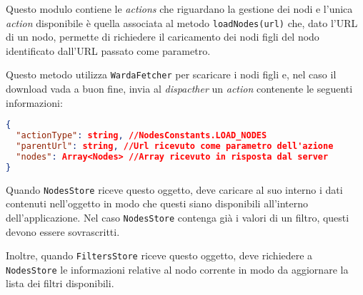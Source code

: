 Questo modulo contiene le \textit{actions} che riguardano la gestione dei nodi e l'unica \textit{action} disponibile è quella associata al metodo \texttt{loadNodes(url)} che, dato l'URL di un nodo, permette di richiedere il caricamento dei nodi figli del nodo identificato dall'URL passato come parametro.

Questo metodo utilizza \texttt{WardaFetcher} per scaricare i nodi figli e, nel caso il download vada a buon fine, invia al \textit{dispacther} un \textit{action} contenente le seguenti informazioni:
\begin{lstlisting}[language=JSON, caption=Action - load nodes]
{
  "actionType": string, //NodesConstants.LOAD_NODES
  "parentUrl": string, //Url ricevuto come parametro dell'azione
  "nodes": Array<Nodes> //Array ricevuto in risposta dal server
}
\end{lstlisting}

Quando \texttt{NodesStore} riceve questo oggetto, deve caricare al suo interno i dati contenuti nell'oggetto in modo che questi siano disponibili all'interno dell'applicazione. Nel caso \texttt{NodesStore} contenga già i valori di un filtro, questi devono essere sovrascritti.

Inoltre, quando \texttt{FiltersStore} riceve questo oggetto, deve richiedere a \texttt{NodesStore} le informazioni relative al nodo corrente in modo da aggiornare la lista dei filtri disponibili.